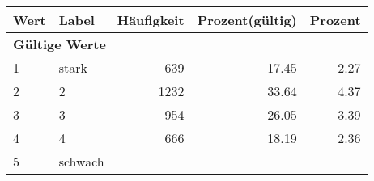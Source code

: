      \begin{longtable}{lXrrr}
     \toprule
     \textbf{Wert} & \textbf{Label} & \textbf{Häufigkeit} & \textbf{Prozent(gültig)} & \textbf{Prozent} \\
     \endhead
     \midrule
     \multicolumn{5}{l}{\textbf{Gültige Werte}}\\

     1 &
     \multicolumn{1}{X}{ stark   } &


       \num{639} &
       \num[round-mode=places,round-precision=2]{17,45} &
         \num[round-mode=places,round-precision=2]{2,27} \\

     2 &
     \multicolumn{1}{X}{ 2   } &


       \num{1232} &
       \num[round-mode=places,round-precision=2]{33,64} &
         \num[round-mode=places,round-precision=2]{4,37} \\

     3 &
     \multicolumn{1}{X}{ 3   } &


       \num{954} &
       \num[round-mode=places,round-precision=2]{26,05} &
         \num[round-mode=places,round-precision=2]{3,39} \\

     4 &
     \multicolumn{1}{X}{ 4   } &


       \num{666} &
       \num[round-mode=places,round-precision=2]{18,19} &
         \num[round-mode=places,round-precision=2]{2,36} \\

     5 &
     \multicolumn{1}{X}{ schwach   } &



\end{longtable}
